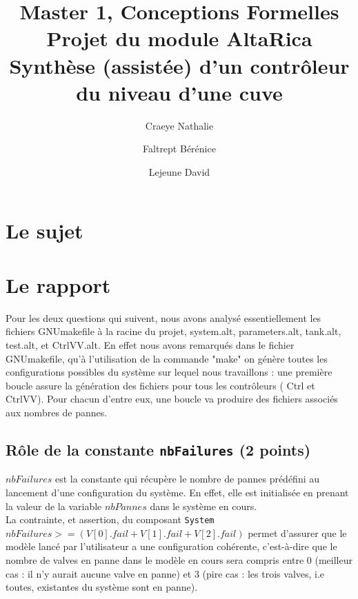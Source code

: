 \documentclass[a4paper]{book}
\newcommand{\altarica}{{\sc AltaRica}}
\begin{document}
\title{Master 1, Conceptions Formelles\\
Projet du module \altarica\\
Synthèse (assistée) d'un contrôleur du niveau d'une cuve}

\date{}

\author{Craeye Nathalie \and Faltrept Bérénice \and Lejeune David}

\maketitle

\chapter{Le sujet}


\chapter{Le rapport}

Pour les deux questions qui suivent, nous avons analysé essentiellement les fichiers GNUmakefile à la racine du projet, system.alt, parameters.alt, tank.alt, test.alt, et CtrlVV.alt.
En effet nous avons remarqués dans le fichier GNUmakefile, qu'à l'utilisation de la commande "make" on génère toutes les configurations possibles du système sur lequel nous travaillons : 
une première boucle assure la génération des fichiers pour tous les contrôleurs ( Ctrl et CtrlVV). Pour chacun d'entre eux, une boucle va produire des fichiers associés aux nombres de pannes.

\section{Rôle de la constante {\tt nbFailures} (2 points)}

$nbFailures$ est la constante qui récupère le nombre de pannes prédéfini au lancement d'une configuration du système. En effet, elle est initialisée en prenant la valeur de la variable $nbPannes$ dans le système en cours. \\
La contrainte, et assertion, du composant {\tt System} $nbFailures >= (V[0].fail + V[1].fail + V[2].fail)$ permet d'assurer que le modèle lancé par l'utilisateur a une configuration cohérente, c'est-à-dire que le nombre de valves en panne dans le modèle en cours sera compris entre 0 (meilleur cas : il n'y aurait aucune valve en panne) et 3 (pire cas : les trois valves, i.e toutes, existantes du système sont en panne). \\
\end{document}
